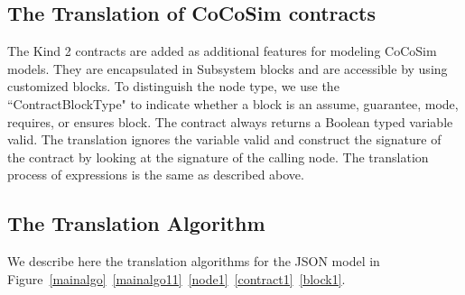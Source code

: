 \documentclass{article}
\begin{document}
\subsection{The Translation of CoCoSim contracts}
The Kind 2 contracts are added as additional features for modeling CoCoSim models.
They are encapsulated in \textsf{Subsystem} blocks and are accessible by using customized 
blocks.
To distinguish the node type, we use the ``ContractBlockType" to indicate whether a block 
is an \textsf{assume}, \textsf{guarantee}, \textsf{mode}, \textsf{requires}, or \textsf{ensures} block.
The contract always returns a Boolean typed variable \textsf{valid}.
The translation ignores the variable \textsf{valid} and construct the signature 
of the contract by looking at the signature of the calling node.
The translation process of expressions is the same as described above. 

\subsection{The Translation Algorithm}

We describe here the translation algorithms for the JSON model in Figure~\ref{mainalgo}~\ref{mainalgo11}~\ref{node1}~\ref{contract1}~\ref{block1}.
\end{document}
